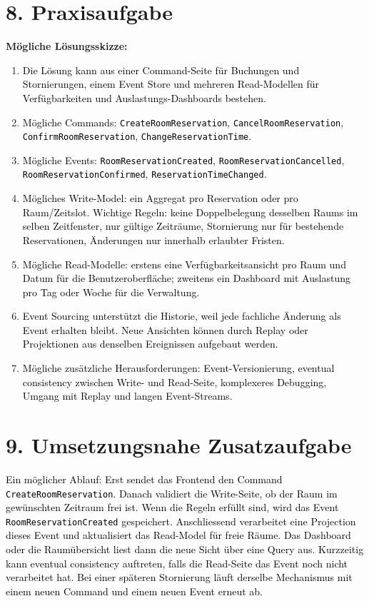 \documentclass[11pt,a4paper]{article}
\newcommand{\solution}[1]{\textcolor{black}{#1}}
\begin{document}
\section*{8. Praxisaufgabe}
\textbf{Mögliche Lösungsskizze:}
\begin{enumerate}
  \item \solution{Die Lösung kann aus einer Command-Seite für Buchungen und Stornierungen, einem Event Store und mehreren Read-Modellen für Verfügbarkeiten und Auslastungs-Dashboards bestehen.}
  \item \solution{Mögliche Commands: \texttt{CreateRoomReservation}, \texttt{CancelRoomReservation}, \texttt{ConfirmRoomReservation}, \texttt{ChangeReservationTime}.}
  \item \solution{Mögliche Events: \texttt{RoomReservationCreated}, \texttt{RoomReservationCancelled}, \texttt{RoomReservationConfirmed}, \texttt{ReservationTimeChanged}.}
  \item \solution{Mögliches Write-Model: ein Aggregat pro Reservation oder pro Raum/Zeitslot. Wichtige Regeln: keine Doppelbelegung desselben Raums im selben Zeitfenster, nur gültige Zeiträume, Stornierung nur für bestehende Reservationen, Änderungen nur innerhalb erlaubter Fristen.}
  \item \solution{Mögliche Read-Modelle: erstens eine Verfügbarkeitsansicht pro Raum und Datum für die Benutzeroberfläche; zweitens ein Dashboard mit Auslastung pro Tag oder Woche für die Verwaltung.}
  \item \solution{Event Sourcing unterstützt die Historie, weil jede fachliche Änderung als Event erhalten bleibt. Neue Ansichten können durch Replay oder Projektionen aus denselben Ereignissen aufgebaut werden.}
  \item \solution{Mögliche zusätzliche Herausforderungen: Event-Versionierung, eventual consistency zwischen Write- und Read-Seite, komplexeres Debugging, Umgang mit Replay und langen Event-Streams.}
\end{enumerate}

\section*{9. Umsetzungsnahe Zusatzaufgabe}
\solution{Ein möglicher Ablauf: Erst sendet das Frontend den Command \texttt{CreateRoomReservation}. Danach validiert die Write-Seite, ob der Raum im gewünschten Zeitraum frei ist. Wenn die Regeln erfüllt sind, wird das Event \texttt{RoomReservationCreated} gespeichert. Anschliessend verarbeitet eine Projection dieses Event und aktualisiert das Read-Model für freie Räume. Das Dashboard oder die Raumübersicht liest dann die neue Sicht über eine Query aus. Kurzzeitig kann eventual consistency auftreten, falls die Read-Seite das Event noch nicht verarbeitet hat. Bei einer späteren Stornierung läuft derselbe Mechanismus mit einem neuen Command und einem neuen Event erneut ab.}
\end{document}
